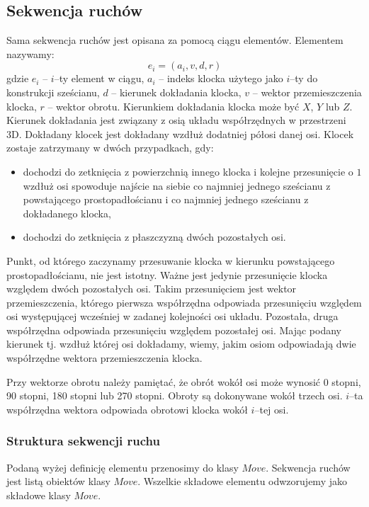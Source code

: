 \documentclass[12pt]{article}
\begin{document}
\subsection{Sekwencja ruchów}
Sama sekwencja ruchów jest opisana za pomocą ciągu elementów. Elementem
nazywamy:
\begin{equation}
	e_i = (a_i,v,d,r)
\end{equation}
gdzie
$e_i$ -- $i$--ty element w ciągu,
$a_i$ -- indeks klocka użytego jako $i$--ty do konstrukcji sześcianu,
$d$ -- kierunek dokładania klocka,
$v$ -- wektor przemieszczenia klocka,
$r$ -- wektor obrotu.
Kierunkiem dokładania klocka może być $X$, $Y$ lub $Z$. Kierunek dokładania
jest związany z osią układu współrzędnych w przestrzeni 3D. Dokładany
klocek jest dokładany wzdłuż dodatniej półosi danej osi. Klocek zostaje
zatrzymany w dwóch przypadkach, gdy:
\begin{itemize}
	\item dochodzi do zetknięcia z powierzchnią innego klocka i kolejne
		przesunięcie o $1$ wzdłuż osi spowoduje najście na siebie co najmniej 
		jednego sześcianu z powstającego prostopadłościanu i co najmniej
		jednego sześcianu z dokładanego klocka,
	\item dochodzi do zetknięcia z płaszczyzną dwóch pozostałych osi.
\end{itemize}
Punkt, od którego zaczynamy przesuwanie klocka w kierunku powstającego
prostopadłościanu, nie jest istotny. Ważne jest jedynie przesunięcie
klocka względem dwóch pozostałych osi. Takim przesunięciem jest wektor
przemieszczenia, którego pierwsza współrzędna odpowiada przesunięciu
względem osi występującej wcześniej w zadanej kolejności osi układu.
Pozostała, druga współrzędna odpowiada przesunięciu względem pozostałej
osi. Mając podany kierunek tj. wzdłuż której osi dokładamy, wiemy,
jakim osiom odpowiadają dwie współrzędne wektora przemieszczenia klocka.

Przy wektorze obrotu należy pamiętać, że obrót wokół osi może wynosić
0 stopni, 90 stopni, 180 stopni lub 270 stopni. Obroty są dokonywane
wokół trzech osi. $i$--ta współrzędna wektora odpowiada obrotowi klocka
wokół $i$--tej osi.

\subsubsection{Struktura sekwencji ruchu}
Podaną wyżej definicję elementu przenosimy do klasy $Move$. Sekwencja
ruchów jest listą obiektów klasy $Move$. Wszelkie składowe elementu
odwzorujemy jako składowe klasy $Move$.
\end{document}
